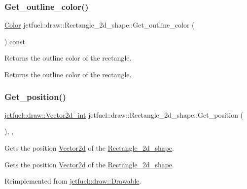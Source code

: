 \subsubsection{\texorpdfstring{Get\+\_\+outline\+\_\+color()}{Get\_outline\_color()}}
{\footnotesize\ttfamily \hyperlink{classjetfuel_1_1draw_1_1Color}{Color} jetfuel\+::draw\+::\+Rectangle\+\_\+2d\+\_\+shape\+::\+Get\+\_\+outline\+\_\+color (\begin{DoxyParamCaption}{ }\end{DoxyParamCaption}) const\hspace{0.3cm}{\ttfamily [inline]}}



Returns the outline color of the rectangle. 

Returns the outline color of the rectangle. \mbox{\label{classjetfuel_1_1draw_1_1Rectangle__2d__shape_a60aa3e0fa050e3fbd98177c1eef721b0}} 
\subsubsection{\texorpdfstring{Get\+\_\+position()}{Get\_position()}}
{\footnotesize\ttfamily \hyperlink{classjetfuel_1_1draw_1_1Vector2d}{jetfuel\+::draw\+::\+Vector2d\+\_\+int} jetfuel\+::draw\+::\+Rectangle\+\_\+2d\+\_\+shape\+::\+Get\+\_\+position (\begin{DoxyParamCaption}{ }\end{DoxyParamCaption})\hspace{0.3cm}{\ttfamily [inline]}, {\ttfamily [override]}, {\ttfamily [virtual]}}



Gets the position \hyperlink{classjetfuel_1_1draw_1_1Vector2d}{Vector2d} of the \hyperlink{classjetfuel_1_1draw_1_1Rectangle__2d__shape}{Rectangle\+\_\+2d\+\_\+shape}. 

Gets the position \hyperlink{classjetfuel_1_1draw_1_1Vector2d}{Vector2d} of the \hyperlink{classjetfuel_1_1draw_1_1Rectangle__2d__shape}{Rectangle\+\_\+2d\+\_\+shape}. 

Reimplemented from \hyperlink{classjetfuel_1_1draw_1_1Drawable_ae7ebd30d66db2c8a5d5371cbcf0023fc}{jetfuel\+::draw\+::\+Drawable}.

